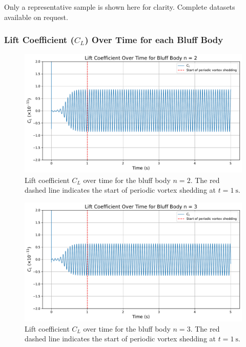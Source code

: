\vspace{1em}

\begin{tcolorbox}[width=\textwidth, height=2.3cm, colframe=black, boxrule=0.5pt, sharp corners]
	\vspace{0.6em}
	Only a representative sample is shown here for clarity. Complete datasets available on request. 
\end{tcolorbox}

\subsubsection{Lift Coefficient ($C_L$) Over Time for each Bluff Body}
\label{sec:C_LvsTime}

\begin{figure}[H]
	\centering
	\includegraphics[width=\textwidth]{images/2face_graph}
	\caption{Lift coefficient $C_L$ over time for the bluff body $n=2$. The red dashed line indicates the start of periodic vortex shedding at $t = \SI{1}{\second}$.}
	\label{fig:2FaceGraph}
\end{figure}

\begin{figure}[H]
	\centering
	\includegraphics[width=\textwidth]{images/3face_graph}
	\caption{Lift coefficient $C_L$ over time for the bluff body $n=3$. The red dashed line indicates the start of periodic vortex shedding at $t = \SI{1}{\second}$.}
	\label{fig:3FaceGraph} 
\end{figure}

